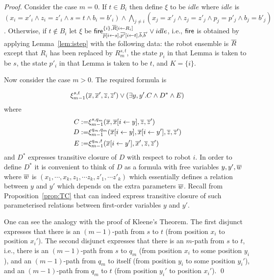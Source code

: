 \begin{proof}
Consider the case $m = 0$. If $t \in B_i$ then define $\xi$ to be $idle$ where 
$idle$ is $(x_i = x'_i \wedge z_i = z'_i \wedge s = t \wedge b_i = b'_i) \wedge \bigwedge_{j \neq i} (x_j = x'_j \wedge z_j = z'_j \wedge p_j = p'_j \wedge b_j = b'_j)$. 
Otherwise, if $t \not \in B_i$ let $\xi$ be 
$\mathsf{fire}_{\overline{p}[i \leftarrow s], \overline{p'}[i \leftarrow t],\overline{b},\overline{b}'}^{\{i\},\overline{R}[i \leftarrow R_i]} \vee idle$, i.e., $\mathsf{fire}$ is 
obtained by applying Lemma~\ref{lem:istep} with the following data: the robot ensemble is $\overline{R}$ except that 
$R_i$ has been replaced by $R_m^{s,t}$, the state $p_i$ in that Lemma is taken to be $s$, 
the state $p'_i$ in that Lemma is taken to be $t$, and $K = \{i\}$. 


Now consider the case $m > 0$.  The required formula is 


\[
 \xi_{m-1}^{s,t}(\overline{x},\overline{x}',\overline{z},\overline{z}') \vee (\exists y,y'. C \wedge D^* \wedge E)
\]
where
\begin{eqnarray*}
C := & \xi_{m-1}^{s,q_m}(\overline{x}, \overline{x}[i \leftarrow y],\overline{z},\overline{z}')\\
D := & \xi_{m-1}^{q_m,q_m}(\overline{x}[i \leftarrow y],\overline{x}[i \leftarrow y'],\overline{z},\overline{z}')\\
E := & \xi_{m-1}^{q_m,t}(\overline{x}[i \leftarrow y'],\overline{x}',\overline{z},\overline{z}')
\end{eqnarray*}
 and $D^*$ expresses transitive closure of $D$ with respect to robot $i$. In order to define $D^*$ 
 it is convenient to think of $D$ as a formula with free variables $y,y',\overline{w}$ where $\overline{w}$ is 
 $(x_1, \cdots, x_k, z_1, \cdots z_k, z'_1, \cdots z'_k)$ which essentially 
 defines a relation between $y$ and $y'$ which depends on the extra parameters $\overline{w}$.
 Recall from Proposition~\ref{prop:TC} that \msol can indeed express transitive closure of such parameterised relations between first-order variables $y$ and $y'$.

 One can see the analogy with the proof of Kleene's Theorem.
 The first disjunct expresses that there is an $(m-1)$-path from $s$ to $t$ (from position $x_i$ to position $x_i'$). The 
 second disjunct expresses that there is an $m$-path from $s$ to $t$, i.e., 
 there is an $(m-1)$-path from $s$ to $q_m$ (from position $x_i$ to some position $y_i$), 
 and an $(m-1)$-path from $q_m$ to itself (from position $y_i$ to some position $y_i'$), 
 and an $(m-1)$-path from $q_m$ to $t$ (from position $y_i'$ to position $x_i'$).
\qed
\end{proof}

